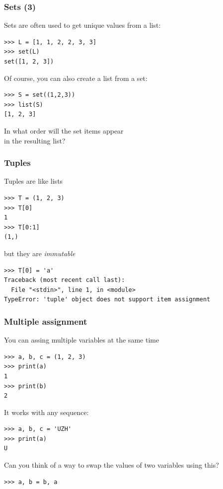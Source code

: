 \documentclass[english,serif,mathserif,xcolor=pdftex,dvipsnames,table]{beamer}
\begin{document}
\begin{frame}[fragile]
  \frametitle{Sets (3)}
  Sets are often used to get unique values from a list:
  \begin{lstlisting}
>>> L = [1, 1, 2, 2, 3, 3]
>>> set(L)
set([1, 2, 3])
 \end{lstlisting}

\+\pause
Of course, you can also create a list from a set:
\begin{lstlisting}
>>> S = set((1,2,3))
>>> list(S)
[1, 2, 3]
\end{lstlisting}

\+\pause
\begin{question}
  In what order will the set items appear \\ in the resulting list?
\end{question}

\end{frame}


\begin{frame}[fragile]
  \frametitle{Tuples}
  Tuples are like lists
  \begin{lstlisting}
>>> T = (1, 2, 3)
>>> T[0]
1
>>> T[0:1]
(1,)
  \end{lstlisting}

  \+
but they are \textit{immutable}

\begin{lstlisting}[basicstyle=\footnotesize\ttfamily]
>>> T[0] = 'a'
Traceback (most recent call last):
  File "<stdin>", line 1, in <module>
TypeError: 'tuple' object does not support item assignment
\end{lstlisting}
\end{frame}


\begin{frame}[fragile]
\frametitle{Multiple assignment}
You can assing multiple variables at the same time
\begin{lstlisting}
>>> a, b, c = (1, 2, 3)
>>> print(a)
1
>>> print(b)
2
\end{lstlisting}

\+

It works with any sequence:

\begin{lstlisting}
>>> a, b, c = 'UZH'
>>> print(a)
U
\end{lstlisting}

\pause
\begin{question}
  Can you think of a way to swap the values of two variables using this?
\pause
\begin{lstlisting}
>>> a, b = b, a
\end{lstlisting}
\end{question}
\end{frame}
\end{document}

